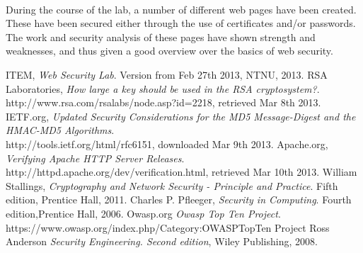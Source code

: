 \documentclass[a4paper,11pt]{article}
\begin{document}
\paragraph{}During the course of the lab, a number of different web pages have been created. These have been secured either through the use of certificates and/or passwords. The work and security analysis of these pages have shown strength and weaknesses, and thus given a good overview over the basics of web security.\\
\begin{thebibliography}{9}
ITEM, 
	\emph{Web Security Lab}. Version from Feb 27th 2013, NTNU, 2013. 
RSA Laboratories, \emph{How large a key should be used in the RSA cryptosystem?}.\\ http://www.rsa.com/rsalabs/node.asp?id=2218, retrieved Mar 8th 2013.	
IETF.org, \emph{Updated Security Considerations for the MD5 Message-Digest and the HMAC-MD5 Algorithms}.\\ http://tools.ietf.org/html/rfc6151, downloaded Mar 9th 2013.
 Apache.org, \emph{Verifying Apache HTTP Server Releases}.\\ http://httpd.apache.org/dev/verification.html, retrieved Mar 10th 2013.
William Stallings, \emph{Cryptography and Network Security - Principle and Practice}. Fifth edition, Prentice Hall, 2011.
Charles P. Pfleeger, \emph{Security in Computing}. Fourth edition,Prentice Hall, 2006.
Owasp.org \emph{Owasp Top Ten Project}.\\ https://www.owasp.org/index.php/Category:OWASP\textunderscore Top\textunderscore Ten \textunderscore Project
Ross Anderson \emph{Security Engineering. Second edition}, Wiley Publishing, 2008.
\end{thebibliography}
\end{document}
